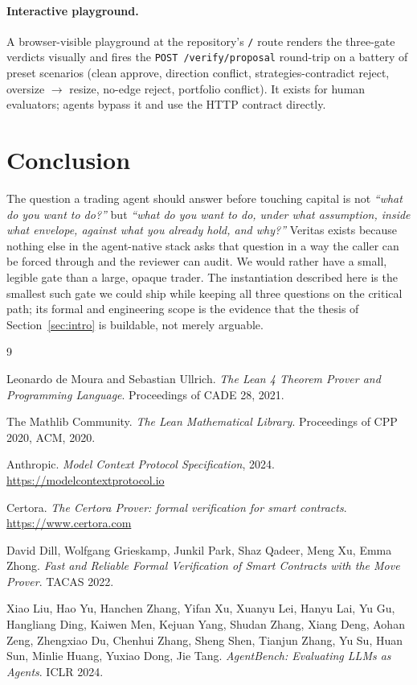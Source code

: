\documentclass[11pt, a4paper]{article}
\begin{document}
\paragraph{Interactive playground.} A browser-visible playground at
the repository's \texttt{/} route renders the three-gate verdicts
visually and fires the \texttt{POST /verify/proposal} round-trip on a
battery of preset scenarios (clean approve, direction conflict,
strategies-contradict reject, oversize $\rightarrow$ resize, no-edge
reject, portfolio conflict). It exists for human evaluators; agents
bypass it and use the HTTP contract directly.

\section{Conclusion}
\label{sec:conclusion}

The question a trading agent should answer before touching capital is
not \emph{``what do you want to do?''} but \emph{``what do you want to
do, under what assumption, inside what envelope, against what you
already hold, and why?''} Veritas exists because nothing else in the
agent-native stack asks that question in a way the caller can be
forced through and the reviewer can audit. We would rather have a
small, legible gate than a large, opaque trader. The instantiation
described here is the smallest such gate we could ship while keeping
all three questions on the critical path; its formal and engineering
scope is the evidence that the thesis of Section~\ref{sec:intro} is
buildable, not merely arguable.

\begin{thebibliography}{9}

Leonardo de Moura and Sebastian Ullrich.
\emph{The Lean 4 Theorem Prover and Programming Language}.
Proceedings of CADE 28, 2021.

The Mathlib Community.
\emph{The Lean Mathematical Library}.
Proceedings of CPP 2020, ACM, 2020.

Anthropic.
\emph{Model Context Protocol Specification}, 2024.
\url{https://modelcontextprotocol.io}

Certora.
\emph{The Certora Prover: formal verification for smart contracts}.
\url{https://www.certora.com}

David Dill, Wolfgang Grieskamp, Junkil Park, Shaz Qadeer, Meng Xu, Emma Zhong.
\emph{Fast and Reliable Formal Verification of Smart Contracts with the Move Prover}.
TACAS 2022.

Xiao Liu, Hao Yu, Hanchen Zhang, Yifan Xu, Xuanyu Lei, Hanyu Lai, Yu Gu,
Hangliang Ding, Kaiwen Men, Kejuan Yang, Shudan Zhang, Xiang Deng, Aohan Zeng,
Zhengxiao Du, Chenhui Zhang, Sheng Shen, Tianjun Zhang, Yu Su, Huan Sun,
Minlie Huang, Yuxiao Dong, Jie Tang.
\emph{AgentBench: Evaluating LLMs as Agents}.
ICLR 2024.

\end{thebibliography}
\end{document}
